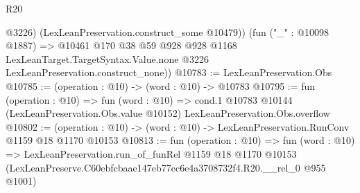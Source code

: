 \begin{lexlean}{R20}
\begin{coremodule}
          @3226)
        (LexLeanPreservation.construct_some @10479))
      (fun ("_" : @10098 @1887) =>
      @10461
        @170
        @38
        @59
        @928
        @928
        @1168
        LexLeanTarget.TargetSyntax.Value.none
        @3226
        LexLeanPreservation.construct_none))
@10783 := LexLeanPreservation.Obs
@10785 := (operation : @10) -> (word : @10) -> @10783
@10795 := fun (operation : @10) =>
  fun (word : @10) =>
  cond.{1} @10783 @10144 (LexLeanPreservation.Obs.value @10152) LexLeanPreservation.Obs.overflow
@10802 := (operation : @10) -> (word : @10) -> LexLeanPreservation.RunConv @1159 @18 @1170 @10153
@10813 := fun (operation : @10) =>
  fun (word : @10) =>
  LexLeanPreservation.run_of_funRel
    @1159
    @18
    @1170
    @10153
    (LexLeanPreserve.C60ebfcbaae147eb77ec6e4a3708732f4.R20.__rel_0 @955 @1001)
\end{coremodule}
\end{lexlean}

